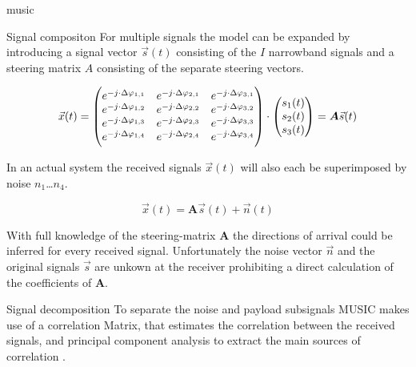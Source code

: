 \begin{subchapter}{\acrshort{music}}
\begin{subsubchapter}{Signal compositon}
    For multiple signals the model can be expanded by
    introducing a signal vector $\vec{s}(t)$ consisting
    of the $I$ narrowband signals and a steering matrix
    $A$ consisting of the separate steering vectors.

    \begin{equation}
      \vec{x}(t) =
        \begin{pmatrix}
          e^{-j \cdot \Delta\varphi_{1,1}} & e^{-j \cdot \Delta\varphi_{2,1}} & e^{-j \cdot \Delta\varphi_{3,1}} \\
          e^{-j \cdot \Delta\varphi_{1,2}} & e^{-j \cdot \Delta\varphi_{2,2}} & e^{-j \cdot \Delta\varphi_{3,2}} \\
          e^{-j \cdot \Delta\varphi_{1,3}} & e^{-j \cdot \Delta\varphi_{2,3}} & e^{-j \cdot \Delta\varphi_{3,3}} \\
          e^{-j \cdot \Delta\varphi_{1,4}} & e^{-j \cdot \Delta\varphi_{2,4}} & e^{-j \cdot \Delta\varphi_{3,4}}
        \end{pmatrix}
        \cdot
        \begin{pmatrix}
          s_{1}(t) \\
          s_{2}(t) \\
          s_{3}(t)
        \end{pmatrix}
      = \\
      \bm{A} \vec{s}(t)
    \end{equation}

    In an actual system the received signals $\vec{x}(t)$ will also
    each be superimposed by noise $n_{1}$…$n_{4}$.

    \begin{equation}
      \vec{x}(t) =  \bm{A} \vec{s}(t) + \vec{n}(t)
    \end{equation}

    With full knowledge of the steering-matrix $\bm{A}$ the
    directions of arrival could be inferred for every received
    signal. Unfortunately the noise vector $\vec{n}$ and the
    original signals $\vec{s}$ are unkown at the receiver prohibiting
    a direct calculation of the coefficients of $\bm{A}$.
  \end{subsubchapter}

  \begin{subsubchapter}{Signal decomposition}
    To separate the noise and payload subsignals
    MUSIC makes use of a correlation Matrix,
    that estimates the correlation between the received
    signals, and principal component analysis to
    extract the main sources of correlation \cite{vibergottersten1991}. \\


\end{subsubchapter}
\end{subchapter}
